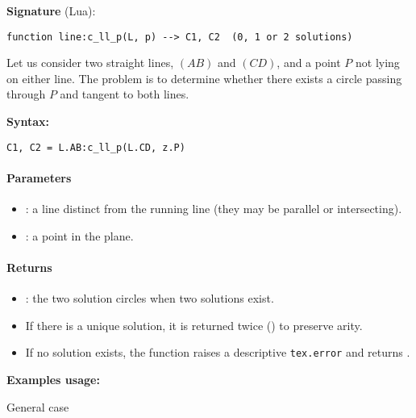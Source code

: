 \medskip
\noindent
\textbf{Signature} (Lua):
\begin{verbatim}
function line:c_ll_p(L, p) --> C1, C2  (0, 1 or 2 solutions)
\end{verbatim}


Let us consider two straight lines, $(AB)$ and $(CD)$, and a point $P$ not lying on either line. The problem is to determine whether there exists a circle passing through $P$ and tangent to both lines.

\medskip
\noindent
\textbf{Syntax:}

\begin{verbatim}
C1, C2 = L.AB:c_ll_p(L.CD, z.P)
\end{verbatim}

\medskip
\noindent
\paragraph*{Parameters}
\begin{itemize}
  \item {}: a line distinct from the running line  (they may be parallel or intersecting).
  \item {}: a point in the plane.
\end{itemize}

\medskip
\noindent
\paragraph*{Returns}
\begin{itemize}
  \item {}: the two solution circles when two solutions exist.
  \item If there is a unique solution, it is returned twice () to preserve arity.
  \item If no solution exists, the function raises a descriptive \verb|tex.error| and returns .
\end{itemize}


\medskip
\noindent
\textbf{Examples usage:}

\vspace{1em}

General case

\begin{tkzexample}[latex=.5\textwidth]
\begin{center}
\end{center}
\end{tkzexample}


